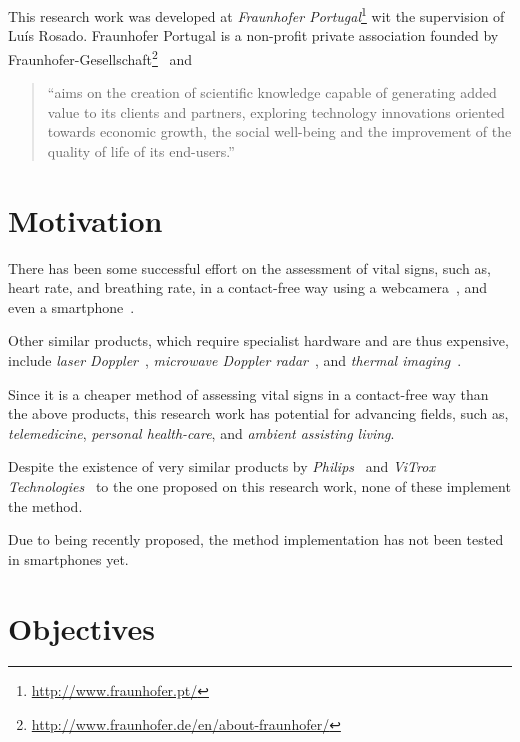 This research work was developed at \emph{Fraunhofer
Portugal}\footnote{\url{http://www.fraunhofer.pt/}} wit the supervision of
Luís Rosado. Fraunhofer Portugal is a non-profit private association
founded by Fraunhofer-Gesellschaft\footnote{\url{http://www.fraunhofer.de/en/about-fraunhofer/}}~\cite{Fraunhofer2013} and

\begin{quote}
  ``aims on the creation of scientific knowledge capable of
  generating added value to its clients and partners, exploring
  technology innovations oriented towards economic growth, the
  social well-being and the improvement of the quality of life of
  its end-users.''~\cite{Fraunhofer2013}
\end{quote}

\section{Motivation} \label{sec:intro:motivation}


There has been some successful effort on the assessment of vital
signs, such as, heart rate, and breathing rate, in a contact-free
way using a webcamera~\cite{Wu2012Eulerian, Poh2010Non, Poh2011Advancements},
and even a smartphone~\cite{Vitrox2013, Philips2013}.

Other similar products, which require specialist hardware and are
thus expensive, include \emph{laser Doppler}~\cite{Ulyanov1993Pulse},
\emph{microwave Doppler radar}~\cite{Greneker1997Radar}, and
\emph{thermal imaging}~\cite{Garbey2007Contact}.

Since it is a cheaper method of assessing vital signs in a
contact-free way than the above products, this research work has
potential for advancing fields, such as, \emph{telemedicine},
\emph{personal health-care}, and \emph{ambient assisting living}.

Despite the existence of very similar products by
\emph{Philips}~\cite{Philips2013} and
\emph{ViTrox Technologies}~\cite{Vitrox2013}
to the one proposed on this research work, none of these implement
the \evm{} method.

Due to being recently proposed, the \evm{} method implementation
has not been tested in smartphones yet.

\section{Objectives} \label{sec:intro:objectives}

